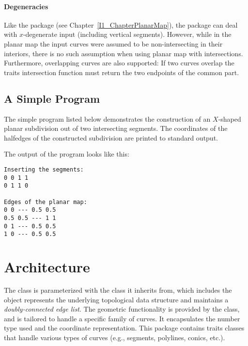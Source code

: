 \paragraph{Degeneracies} 
  
Like the  package (see Chapter~\ref{I1_ChapterPlanarMap}), 
the  package can deal with $x$-degenerate 
input (including vertical segments). However, while in the planar map the input
curves were assumed to be non-intersecting in their interiors, there is no 
such assumption when using planar map with intersections. Furthermore, 
overlapping curves are also supported: If two curves overlap the traits 
intersection function must return the two endpoints of the common part.

\subsection{A Simple Program}
\label{ssec:example1}
The simple program listed below demonstrates the construction of an
$X$-shaped planar subdivision out of two intersecting segments.
The coordinates of the halfedges of the constructed subdivision are
printed to standard output.


The output of the program looks like this:
\begin{verbatim}
Inserting the segments:
0 0 1 1
0 1 1 0

Edges of the planar map:
0 0 --- 0.5 0.5
0.5 0.5 --- 1 1
0 1 --- 0.5 0.5
1 0 --- 0.5 0.5
\end{verbatim}

\section{Architecture}

The  class 
is parameterized with the  class it inherits from, which 
includes the  object represents the underlying topological data structure and maintains a {\em doubly-connected edge list}. 
The geometric functionality is provided by the  class, and is
tailored to handle a specific family of curves. It encapsulates the
number type used and the coordinate representation. This package
contains traits classes that handle various types of curves (e.g.,
segments, polylines, conics, etc.).

